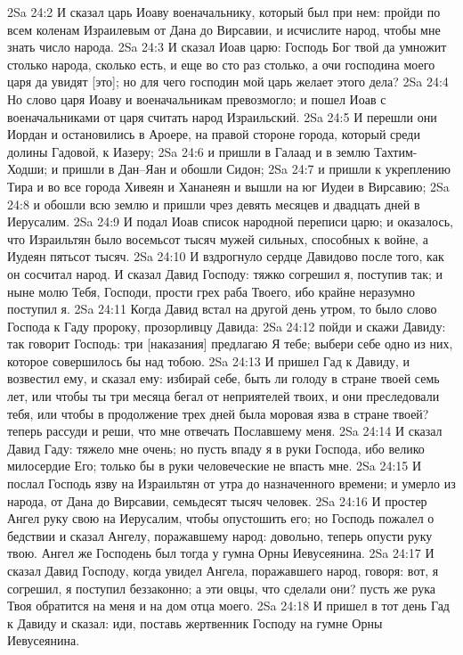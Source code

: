 2Sa 24:2  И сказал царь Иоаву военачальнику, который был при нем: пройди по всем коленам Израилевым от Дана до Вирсавии, и исчислите народ, чтобы мне знать число народа.
2Sa 24:3  И сказал Иоав царю: Господь Бог твой да умножит столько народа, сколько есть, и еще во сто раз столько, а очи господина моего царя да увидят [это]; но для чего господин мой царь желает этого дела?
2Sa 24:4  Но слово царя Иоаву и военачальникам превозмогло; и пошел Иоав с военачальниками от царя считать народ Израильский.
2Sa 24:5  И перешли они Иордан и остановились в Ароере, на правой стороне города, который среди долины Гадовой, к Иазеру;
2Sa 24:6  и пришли в Галаад и в землю Тахтим-Ходши; и пришли в Дан--Яан и обошли Сидон;
2Sa 24:7  и пришли к укреплению Тира и во все города Хивеян и Хананеян и вышли на юг Иудеи в Вирсавию;
2Sa 24:8  и обошли всю землю и пришли чрез девять месяцев и двадцать дней в Иерусалим.
2Sa 24:9  И подал Иоав список народной переписи царю; и оказалось, что Израильтян было восемьсот тысяч мужей сильных, способных к войне, а Иудеян пятьсот тысяч.
2Sa 24:10  И вздрогнуло сердце Давидово после того, как он сосчитал народ. И сказал Давид Господу: тяжко согрешил я, поступив так; и ныне молю Тебя, Господи, прости грех раба Твоего, ибо крайне неразумно поступил я.
2Sa 24:11  Когда Давид встал на другой день утром, то было слово Господа к Гаду пророку, прозорливцу Давида:
2Sa 24:12  пойди и скажи Давиду: так говорит Господь: три [наказания] предлагаю Я тебе; выбери себе одно из них, которое совершилось бы над тобою.
2Sa 24:13  И пришел Гад к Давиду, и возвестил ему, и сказал ему: избирай себе, быть ли голоду в стране твоей семь лет, или чтобы ты три месяца бегал от неприятелей твоих, и они преследовали тебя, или чтобы в продолжение трех дней была моровая язва в стране твоей? теперь рассуди и реши, что мне отвечать Пославшему меня.
2Sa 24:14  И сказал Давид Гаду: тяжело мне очень; но пусть впаду я в руки Господа, ибо велико милосердие Его; только бы в руки человеческие не впасть мне.
2Sa 24:15  И послал Господь язву на Израильтян от утра до назначенного времени; и умерло из народа, от Дана до Вирсавии, семьдесят тысяч человек.
2Sa 24:16  И простер Ангел руку свою на Иерусалим, чтобы опустошить его; но Господь пожалел о бедствии и сказал Ангелу, поражавшему народ: довольно, теперь опусти руку твою. Ангел же Господень был тогда у гумна Орны Иевусеянина.
2Sa 24:17  И сказал Давид Господу, когда увидел Ангела, поражавшего народ, говоря: вот, я согрешил, я поступил беззаконно; а эти овцы, что сделали они? пусть же рука Твоя обратится на меня и на дом отца моего.
2Sa 24:18  И пришел в тот день Гад к Давиду и сказал: иди, поставь жертвенник Господу на гумне Орны Иевусеянина.
